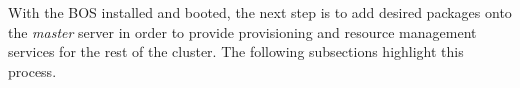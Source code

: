 With the BOS installed and booted, the next step is to add desired \OHPC{} packages
onto the {\em master} server in order to provide provisioning and resource
management services for the rest of the cluster. The following subsections
highlight this process.
